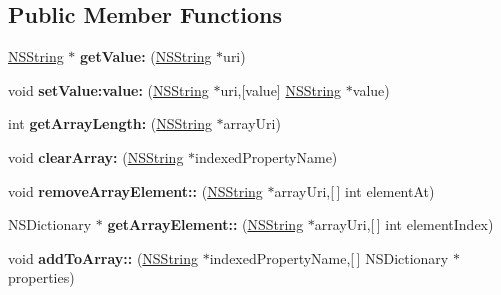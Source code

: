 \subsection*{\-Public \-Member \-Functions}
\begin{DoxyCompactItemize}
\item 
\hypertarget{interface_mobile_object_a100c5b1092c4942782790ee9d313e9eb}{
\hyperlink{class_n_s_string}{\-N\-S\-String} $\ast$ {\bfseries get\-Value\-:} (\hyperlink{class_n_s_string}{\-N\-S\-String} $\ast$uri)}
\label{interface_mobile_object_a100c5b1092c4942782790ee9d313e9eb}

\item 
\hypertarget{interface_mobile_object_aaf26c3b84a9884180398c5e0b129dfae}{
void {\bfseries set\-Value\-:value\-:} (\hyperlink{class_n_s_string}{\-N\-S\-String} $\ast$uri,\mbox{[}value\mbox{]} \hyperlink{class_n_s_string}{\-N\-S\-String} $\ast$value)}
\label{interface_mobile_object_aaf26c3b84a9884180398c5e0b129dfae}

\item 
\hypertarget{interface_mobile_object_a98a4f223b4b04adcf8c485bd0a49229b}{
int {\bfseries get\-Array\-Length\-:} (\hyperlink{class_n_s_string}{\-N\-S\-String} $\ast$array\-Uri)}
\label{interface_mobile_object_a98a4f223b4b04adcf8c485bd0a49229b}

\item 
\hypertarget{interface_mobile_object_ab84b8d442ba72b26b953943dc76b0057}{
void {\bfseries clear\-Array\-:} (\hyperlink{class_n_s_string}{\-N\-S\-String} $\ast$indexed\-Property\-Name)}
\label{interface_mobile_object_ab84b8d442ba72b26b953943dc76b0057}

\item 
\hypertarget{interface_mobile_object_a1ab214f95389eee21be8d37c352fa1e5}{
void {\bfseries remove\-Array\-Element\-::} (\hyperlink{class_n_s_string}{\-N\-S\-String} $\ast$array\-Uri,\mbox{[}$\,$\mbox{]} int element\-At)}
\label{interface_mobile_object_a1ab214f95389eee21be8d37c352fa1e5}

\item 
\hypertarget{interface_mobile_object_a13252151948be1be16bc93efd1ead68f}{
\-N\-S\-Dictionary $\ast$ {\bfseries get\-Array\-Element\-::} (\hyperlink{class_n_s_string}{\-N\-S\-String} $\ast$array\-Uri,\mbox{[}$\,$\mbox{]} int element\-Index)}
\label{interface_mobile_object_a13252151948be1be16bc93efd1ead68f}

\item 
\hypertarget{interface_mobile_object_a2a3e500096bfa9318bb42702d62b22bc}{
void {\bfseries add\-To\-Array\-::} (\hyperlink{class_n_s_string}{\-N\-S\-String} $\ast$indexed\-Property\-Name,\mbox{[}$\,$\mbox{]} \-N\-S\-Dictionary $\ast$properties)}
\label{interface_mobile_object_a2a3e500096bfa9318bb42702d62b22bc}


\end{DoxyCompactItemize}
